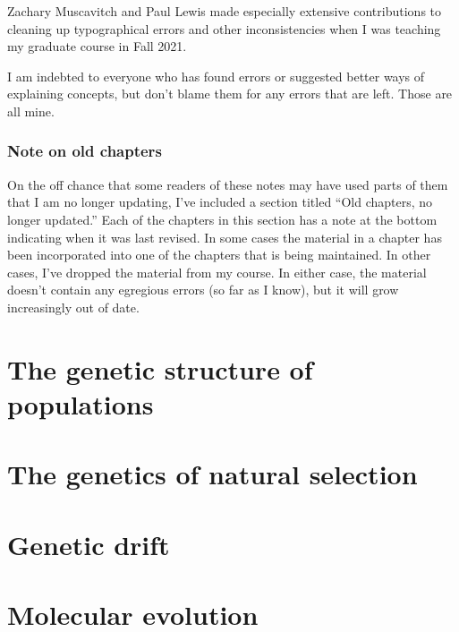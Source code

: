 \documentclass[12pt,titlepage,openright]{book}
\begin{document}
Zachary Muscavitch and Paul Lewis made especially extensive
contributions to cleaning up typographical errors and other
inconsistencies when I was teaching my graduate course in Fall 2021. 

I am indebted to everyone who has found errors or suggested better
ways of explaining concepts, but don't blame them for any errors that
are left. Those are all mine.

\section*{Note on old chapters}

On the off chance that some readers of these notes may have used parts
of them that I am no longer updating, I've included a section titled
``Old chapters, no longer updated.'' Each of the chapters in this
section has a note at the bottom indicating when it was last
revised. In some cases the material in a chapter has been incorporated
into one of the chapters that is being maintained. In other cases,
I've dropped the material from my course. In either case, the material
doesn't contain any egregious errors (so far as I know), but it will
grow increasingly out of date.

\newpage
{}
\part{The genetic structure of populations}








\part{The genetics of natural selection}




\part{Genetic drift}






\part{Molecular evolution}
\end{document}
